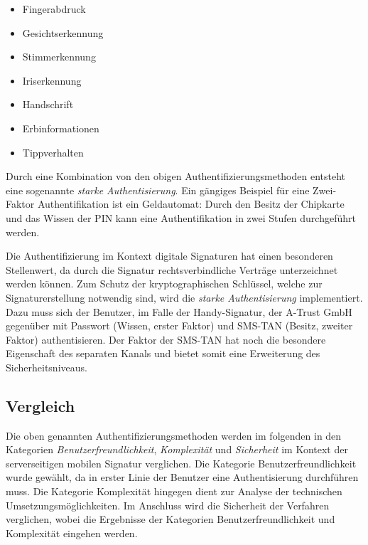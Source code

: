 \documentclass[11pt,a4paper,ngerman]{scrreprt}
\begin{document}
\begin{description}[font=\rmfamily]
    \begin{itemize}
        \item Fingerabdruck
        \item Gesichtserkennung
        \item Stimmerkennung
        \item Iriserkennung
        \item Handschrift
        \item Erbinformationen
        \item Tippverhalten
    \end{itemize}
\end{description}
Durch eine Kombination von den obigen Authentifizierungsmethoden entsteht eine sogenannte \emph{starke Authentisierung}. Ein gängiges Beispiel für eine Zwei-Faktor Authentifikation ist ein Geldautomat: Durch den Besitz der Chipkarte und das Wissen der PIN kann eine Authentifikation in zwei Stufen durchgeführt werden.

Die Authentifizierung im Kontext digitale Signaturen hat einen besonderen Stellenwert, da durch die Signatur rechtsverbindliche Verträge unterzeichnet werden können. Zum Schutz der kryptographischen Schlüssel, welche zur Signaturerstellung notwendig sind, wird die \emph{starke Authentisierung} implementiert. Dazu muss sich der Benutzer, im Falle der Handy-Signatur, der A-Trust GmbH gegenüber mit Passwort (Wissen, erster Faktor) und SMS-TAN (Besitz, zweiter Faktor) authentisieren. Der Faktor der SMS-TAN hat noch die besondere Eigenschaft des separaten Kanals und bietet somit eine Erweiterung des Sicherheitsniveaus.

\subsection{Vergleich}
Die oben genannten Authentifizierungsmethoden werden im folgenden in den Kategorien \emph{Benutzerfreundlichkeit}, \emph{Komplexität} und \emph{Sicherheit} im Kontext der serverseitigen mobilen Signatur verglichen. Die Kategorie Benutzerfreundlichkeit wurde gewählt, da in erster Linie der Benutzer eine Authentisierung durchführen muss. Die Kategorie Komplexität hingegen dient zur Analyse der technischen Umsetzungsmöglichkeiten. Im Anschluss wird die Sicherheit der Verfahren verglichen, wobei die Ergebnisse der Kategorien Benutzerfreundlichkeit und Komplexität eingehen werden.
\end{document}
